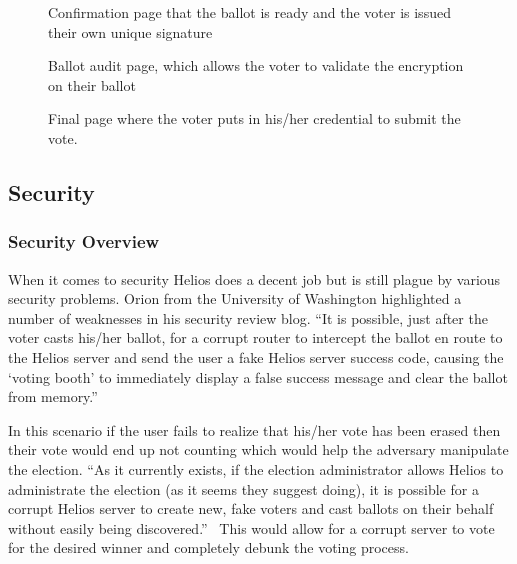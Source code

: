 \begin{figure}
  \centering {}
  \caption{Confirmation page that the ballot is ready and the voter is
    issued their own unique signature}
  \label{fig:helios-signature}
\end{figure}

\begin{figure}
  \centering {}
  \caption{Ballot audit page, which allows the voter to validate the
    encryption on their ballot}
  \label{fig:helios-audit}
\end{figure}

\begin{figure}
  \centering {}
  \caption{Final page where the voter puts in his/her credential to
    submit the vote.}
  \label{fig:helios-submit}
\end{figure}

\subsection{Security}

\subsubsection{Security Overview}

When it comes to security Helios does a decent job but is still plague
by various security problems. Orion from the University of Washington
highlighted a number of weaknesses in his security review blog. ``It
is possible, just after the voter casts his/her ballot, for a corrupt
router to intercept the ballot en route to the Helios server and send
the user a fake Helios server success code, causing the `voting booth'
to immediately display a false success message and clear the ballot
from memory.''~\cite{orion2009}

In this scenario if the user fails to realize that his/her vote has
been erased then their vote would end up not counting which would help
the adversary manipulate the election. ``As it currently exists, if
the election administrator allows Helios to administrate the election
(as it seems they suggest doing), it is possible for a corrupt Helios
server to create new, fake voters and cast ballots on their behalf
without easily being discovered.''~\cite{orion2009} This would allow
for a corrupt server to vote for the desired winner and completely
debunk the voting process.

